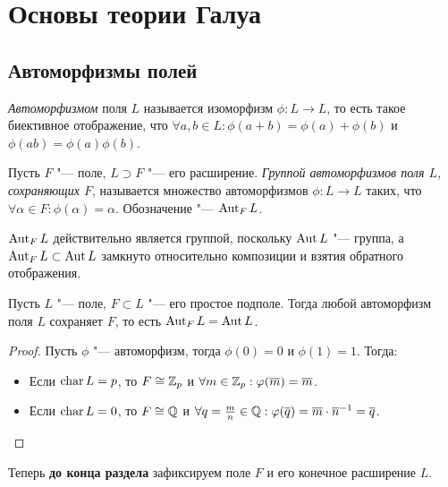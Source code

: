 \section{Основы теории Галуа}

\subsection{Автоморфизмы полей}

\begin{definition}
	\textit{Автоморфизмом} поля $L$ называется изоморфизм $\phi: L \to L$, то есть такое биективное отображение, что $\forall a, b \in L: \phi(a + b) = \phi(a) + \phi(b)$ и $\phi(ab) = \phi(a)\phi(b)$.
\end{definition}

\begin{definition}
	Пусть $F$ "--- поле, $L \supset F$ "--- его расширение. \textit{Группой автоморфизмов поля $L$, сохраняющих $F$}, называется множество автоморфизмов $\phi : L \to L$ таких, что $\forall \alpha \in F: \phi(\alpha) = \alpha$. Обозначение "--- $\operatorname{Aut}_F{L}$.
\end{definition}

\begin{note}
	$\operatorname{Aut}_F{L}$ действительно является группой, поскольку $\operatorname{Aut}{L}$ "--- группа, а $\operatorname{Aut}_F{L} \subset \operatorname{Aut}{L}$ замкнуто относительно композиции и взятия обратного отображения.
\end{note}

\begin{proposition}
	Пусть $L$ "--- поле, $F \subset L$ "--- его простое подполе. Тогда любой автоморфизм поля $L$ сохраняет $F$, то есть $\operatorname{Aut}_F{L} = \operatorname{Aut}{L}$.
\end{proposition}

\begin{proof}
	Пусть $\phi$ "--- автоморфизм, тогда $\phi(0) = 0$ и $\phi(1) = 1$. Тогда:
	\begin{itemize}
		\item Если $\operatorname{char}{L} = p$, то $F \cong \mathbb{Z}_p$ и $\forall m \in \mathbb{Z}_p: \varphi(\overline{m}) = \overline{m}$.
		\item Если $\operatorname{char}{L} = 0$, то $F \cong \mathbb{Q}$ и $\forall q = \frac mn \in \mathbb{Q}: \varphi(\overline{q}) = \overline{m}\cdot\overline{n}^{-1} = \overline{q}$.\qedhere
	\end{itemize}
\end{proof}

Теперь \textbf{до конца раздела} зафиксируем поле $F$ и его конечное расширение $L$.

